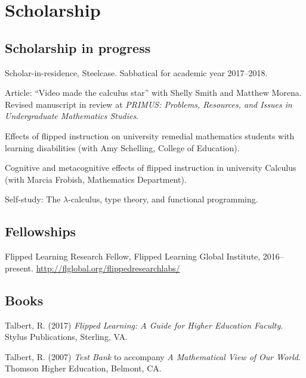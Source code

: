 \documentclass[letterpaper]{article}
\renewenvironment{itemize}{
  \begin{list}{}{
    \setlength{\leftmargin}{1.5em}
	\setlength{\itemsep}{0in}
  }
}{
  \end{list}
}
\begin{document}
\section*{Scholarship}

\subsection*{Scholarship in progress}
\begin{itemize}
	\item Scholar-in-residence, Steelcase. Sabbatical for academic year 2017--2018. 
	\item Article: ``Video made the calculus star'' with Shelly Smith and Matthew Morena. Revised manuscript in review at \textit{PRIMUS: Problems, Resources, and Issues in Undergraduate Mathematics Studies}. 
	\item Effects of flipped instruction on university remedial mathematics students with learning disabilities (with Amy Schelling, College of Education). 
	\item Cognitive and metacognitive effects of flipped instruction in university Calculus (with Marcia Frobish, Mathematics Department). 
	\item Self-study: The $\lambda$-calculus, type theory, and functional programming. 
\end{itemize}

\subsection*{Fellowships}
\begin{itemize}
	\item Flipped Learning Research Fellow, Flipped Learning Global Institute, 2016--present. \url{http://flglobal.org/flippedresearchlabs/}
\end{itemize}

\subsection*{Books}


\begin{itemize}
	\item Talbert, R. (2017) \textit{Flipped Learning: A Guide for Higher Education Faculty}. Stylus Publications, Sterling, VA. 
	\item Talbert, R. (2007) \emph{Test Bank} to accompany \emph{A Mathematical View of Our World}. Thomson Higher Education, Belmont, CA. 
\end{itemize}
\end{document}
